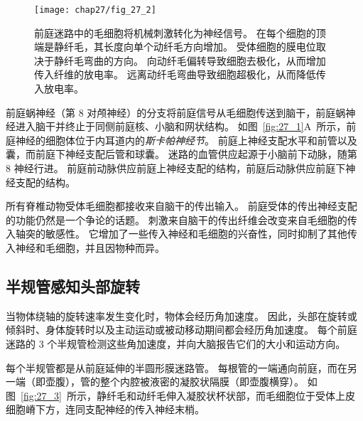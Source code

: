 \begin{figure}[htbp]
	\centering
	\texttt{[image: chap27/fig\_27\_2]}
	\caption{前庭迷路中的毛细胞将机械刺激转化为神经信号。
		在每个细胞的顶端是静纤毛，其长度向单个动纤毛方向增加。
		受体细胞的膜电位取决于静纤毛弯曲的方向。
		向动纤毛偏转导致细胞去极化，从而增加传入纤维的放电率。
		远离动纤毛弯曲导致细胞超极化，从而降低传入放电率\cite{flock1965transducing}。}
	\label{fig:27_2}
\end{figure}


前庭蜗神经（第 8 对颅神经）的分支将前庭信号从毛细胞传送到脑干，前庭蜗神经进入脑干并终止于同侧前庭核、小脑和网状结构。
如图~\ref{fig:27_1}A~所示，前庭神经的细胞体位于内耳道内的\textit{斯卡帕神经节}。
前庭上神经支配水平和前管以及囊，而前庭下神经支配后管和球囊。
迷路的血管供应起源于小脑前下动脉，随第 8 神经行进。
前庭前动脉供应前庭上神经支配的结构，前庭后动脉供应前庭下神经支配的结构。


所有脊椎动物受体毛细胞都接收来自脑干的传出输入。
前庭受体的传出神经支配的功能仍然是一个争论的话题。
刺激来自脑干的传出纤维会改变来自毛细胞的传入轴突的敏感性。
它增加了一些传入神经和毛细胞的兴奋性，同时抑制了其他传入神经和毛细胞，并且因物种而异。



\subsection{半规管感知头部旋转}

当物体绕轴的旋转速率发生变化时，物体会经历角加速度。
因此，头部在旋转或倾斜时、身体旋转时以及主动运动或被动移动期间都会经历角加速度。
每个前庭迷路的 3 个半规管检测这些角加速度，并向大脑报告它们的大小和运动方向。


每个半规管都是从前庭延伸的半圆形膜迷路管。
每根管的一端通向前庭，而在另一端（即壶腹），管的整个内腔被液密的凝胶状隔膜（即壶腹横穿）。
如图~\ref{fig:27_3}~所示，静纤毛和动纤毛伸入凝胶状杯状部，而毛细胞位于受体上皮细胞嵴下方，连同支配神经的传入神经末梢。


